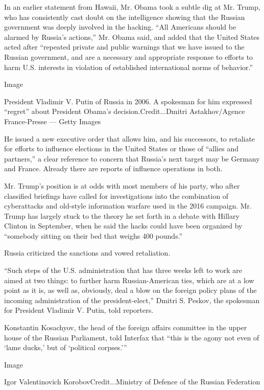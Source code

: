 In an earlier statement from Hawaii, Mr. Obama took a subtle dig at Mr.
Trump, who has consistently cast doubt on the intelligence showing that
the Russian government was deeply involved in the hacking. ``All
Americans should be alarmed by Russia's actions,'' Mr. Obama said, and
added that the United States acted after ``repeated private and public
warnings that we have issued to the Russian government, and are a
necessary and appropriate response to efforts to harm U.S. interests in
violation of established international norms of behavior.''

Image

President Vladimir V. Putin of Russia in 2006. A spokesman for him
expressed ``regret'' about President Obama's decision.Credit...Dmitri
Astakhov/Agence France-Presse --- Getty Images

He issued a new executive order that allows him, and his successors, to
retaliate for efforts to influence elections in the United States or
those of ``allies and partners,'' a clear reference to concern that
Russia's next target may be Germany and France. Already there are
reports of influence operations in both.

Mr. Trump's position is at odds with most members of his party, who
after classified briefings have called for investigations into the
combination of cyberattacks and old-style information warfare used in
the 2016 campaign. Mr. Trump has largely stuck to the theory he set
forth in a debate with Hillary Clinton in September, when he said the
hacks could have been organized by ``somebody sitting on their bed that
weighs 400 pounds.''

Russia criticized the sanctions and vowed retaliation.

``Such steps of the U.S. administration that has three weeks left to
work are aimed at two things: to further harm Russian-American ties,
which are at a low point as it is, as well as, obviously, deal a blow on
the foreign policy plans of the incoming administration of the
president-elect,'' Dmitri S. Peskov, the spokesman for President
Vladimir V. Putin, told reporters.

Konstantin Kosachyov, the head of the foreign affairs committee in the
upper house of the Russian Parliament, told Interfax that ``this is the
agony not even of `lame ducks,' but of `political corpses.'''

Image

Igor Valentinovich KorobovCredit...Ministry of Defence of the Russian
Federation

